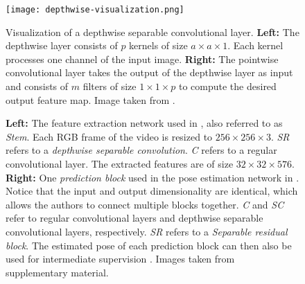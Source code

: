 \begin{figure}[htb!]
    \centering
    \texttt{[image: depthwise-visualization.png]}
    \caption{Visualization of a depthwise separable convolutional layer. \textbf{Left:} The depthwise layer consists of $p$ kernels of size $a \times a \times 1$. Each kernel processes one channel of the input image. \textbf{Right:} The pointwise convolutional layer takes the output of the depthwise layer as input and consists of $m$ filters of size $1 \times 1 \times p$ to compute the desired output feature map. Image taken from \cite{wang_basic_2018}.}
    \label{fig:depthwise-separable-illustration}
\end{figure}


\begin{figure}[htb!]
    \centering
    \hfill
    \caption{\textbf{Left:} The feature extraction network used in \cite{luvizon_2d/3d_2018}, also referred to as \textit{Stem}. Each RGB frame of the video is resized to $256 \times 256 \times 3$. \textit{SR} refers to a \textit{depthwise separable convolution}. \textit{C} refers to a regular convolutional layer. The extracted features are of size $32 \times 32 \times 576$. 
    \textbf{Right:} One \textit{prediction block} used in the pose estimation network in \cite{luvizon_2d/3d_2018}. Notice that the input and output dimensionality are identical, which allows the authors to connect multiple blocks together. \textit{C} and \textit{SC} refer to regular convolutional layers and depthwise separable convolutional layers, respectively. \textit{SR} refers to a \textit{Separable residual block}. The estimated pose of each prediction block can then also be used for intermediate supervision . Images taken from \cite{luvizon_2d/3d_2018} supplementary material.}
\end{figure}


